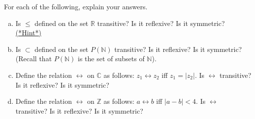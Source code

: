 \begin{exercise}{17}
For each of the following, explain your answers. 
\begin{enumerate}[(a)]
\item Is $\leq$ defined on the set $\mathbb{R}$ transitive? Is it reflexive? Is it symmetric?
\hyperref[sec:EquivalenceRelationsChap:hints]{(*Hint*)}
\item Is $\subset$ defined on the set $P(\mathbb{N})$ transitive? Is it reflexive? Is it symmetric? (Recall that $P(\mathbb{N})$ is the set of subsets of $\mathbb{N}$).
\item Define the relation $\rel$ on $\mathbb{C}$ as follows: $ z_1 \rel z_2$ iff $z_1 = |z_2|$. Is $\rel$ transitive? Is it reflexive? Is it symmetric?
\item Define the relation $\rel$ on $\mathbb{Z}$ as follows: $ a \rel b$ iff $|a - b|< 4$. Is $\rel$ transitive? Is it reflexive? Is it symmetric?
\end{enumerate}
\end{exercise}



